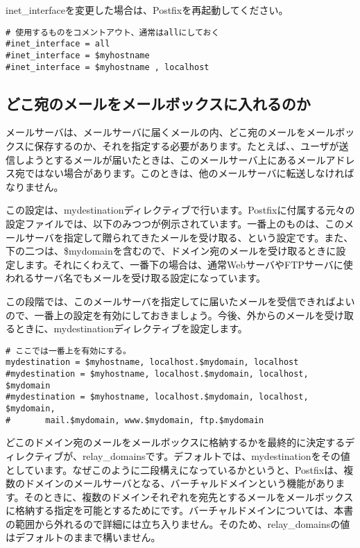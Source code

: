 inet\_interfaceを変更した場合は、Postfixを再起動してください。

\begin{lstlisting}[basicstyle=\ttfamily\footnotesize, frame=single]
# 使用するものをコメントアウト、通常はallにしておく
#inet_interface = all
#inet_interface = $myhostname
#inet_interface = $myhostname , localhost
\end{lstlisting}


\subsection{どこ宛のメールをメールボックスに入れるのか}
メールサーバは、メールサーバに届くメールの内、どこ宛のメールをメールボックスに保存するのか、それを指定する必要があります。たとえば、、ユーザが送信しようとするメールが届いたときは、このメールサーバ上にあるメールアドレス宛ではない場合があります。このときは、他のメールサーバに転送しなければなりません。

この設定は、mydestinationディレクティブで行います。Postfixに付属する元々の設定ファイルでは、以下のみつつが例示されています。一番上のものは、このメールサーバを指定して贈られてきたメールを受け取る、という設定です。また、下の二つは、\$mydomainを含むので、ドメイン宛のメールを受け取るときに設定します。それにくわえて、一番下の場合は、通常WebサーバやFTPサーバに使われるサーバ名でもメールを受け取る設定になっています。

この段階では、このメールサーバを指定してに届いたメールを受信できればよいので、一番上の設定を有効にしておきましょう。今後、外からのメールを受け取るときに、mydestinationディレクティブを設定します。

\begin{lstlisting}[basicstyle=\ttfamily\footnotesize, frame=single]
# ここでは一番上を有効にする。
mydestination = $myhostname, localhost.$mydomain, localhost
#mydestination = $myhostname, localhost.$mydomain, localhost, $mydomain
#mydestination = $myhostname, localhost.$mydomain, localhost, $mydomain,
#       mail.$mydomain, www.$mydomain, ftp.$mydomain
\end{lstlisting}

どこのドメイン宛のメールをメールボックスに格納するかを最終的に決定するディレクティブが、relay\_domainsです。デフォルトでは、mydestinationをその値としています。なぜこのように二段構えになっているかというと、Postfixは、複数のドメインのメールサーバとなる、バーチャルドメインという機能があります。そのときに、複数のドメインそれぞれを宛先とするメールをメールボックスに格納する指定を可能とするためにです。バーチャルドメインについては、本書の範囲から外れるので詳細には立ち入りません。そのため、relay\_domainsの値はデフォルトのままで構いません。

